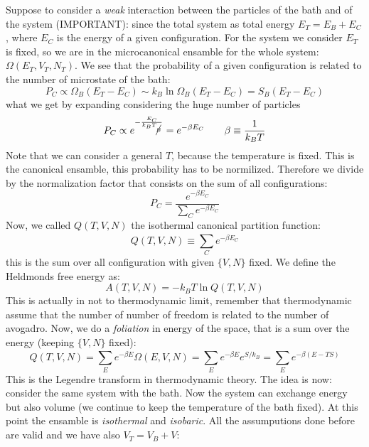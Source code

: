 \documentclass[../main/main.tex]{subfiles}
\begin{document}
Suppose to consider a \emph{weak} interaction between the particles of the bath and of the system (IMPORTANT): since the total system as total energy \( E_T = E_B + E_C\), where \( E_C \) is the energy of a given configuration. For the system we consider \( E_T \) is fixed, so we are in the microcanonical ensamble for the whole system: \( \Omega (E_T,V_T,N_T) \). We see that the probability of a given configuration is related to the number of microstate of the bath:
\begin{equation}
  P_C \propto \Omega _B (E_T - E_C) \sim k_B \ln{\Omega _B (E_T - E_C)} = S_B (E_T - E_C)
  \label{eq:}
\end{equation}
what we get by expanding considering the huge number of particles
\begin{equation}
    P_C \propto e^{-\frac{E_C}{k_B T_{\cancel{B} }}} = e^{- \beta E_C}   \qquad \beta \equiv \frac{1}{k_B T}
  \label{eq:}
\end{equation}
Note that we can consider a general \( T \), because the temperature is fixed.
This is the canonical ensamble, this probability has to be normilized. Therefore we divide by the normalization factor that consists on the sum of all configurations:
\begin{equation}
  P_C = \frac{e^{-\beta E_C} }{\sum_{C}^{} e^{-\beta E_C}   }
  \label{eq:}
\end{equation}
Now, we called \( Q (T,V,N) \) the isothermal canonical partition function:
\begin{equation}
  Q (T,V,N) \equiv \sum_{C}^{} e^{-\beta E_C}
  \label{eq:}
\end{equation}
this is the sum over all configuration with given \( \{V,N\} \) fixed.
We define the Heldmonds free energy as:
\begin{equation}
  A(T,V,N) = -k_B T \ln{Q(T,V,N)}
  \label{eq:}
\end{equation}
This is actually in not to thermodynamic  limit, remember that thermodynamic assume that the number of number of freedom is related to the number of avogadro.
Now, we do a \emph{foliation} in energy of the space, that is a sum over the energy (keeping \( \{V,N\} \) fixed):
\begin{equation}
  Q(T,V,N) = \sum_{E}^{} e^{-\beta E} \Omega (E,V,N) = \sum_{E}^{} e^{-\beta E} e^{S/k_B} = \sum_{E}^{} e^{-\beta (E-T S)}
  \label{eq:}
\end{equation}
This is the Legendre transform in thermodynamic theory. The idea is now: consider the same system with the bath. Now the system can exchange energy but also volume (we continue to keep the temperature of the bath fixed). At this point the ensamble is \emph{isothermal} and \emph{isobaric}. All the assumputions done before are valid and we have also \( V_T = V_B + V \):
\end{document}
